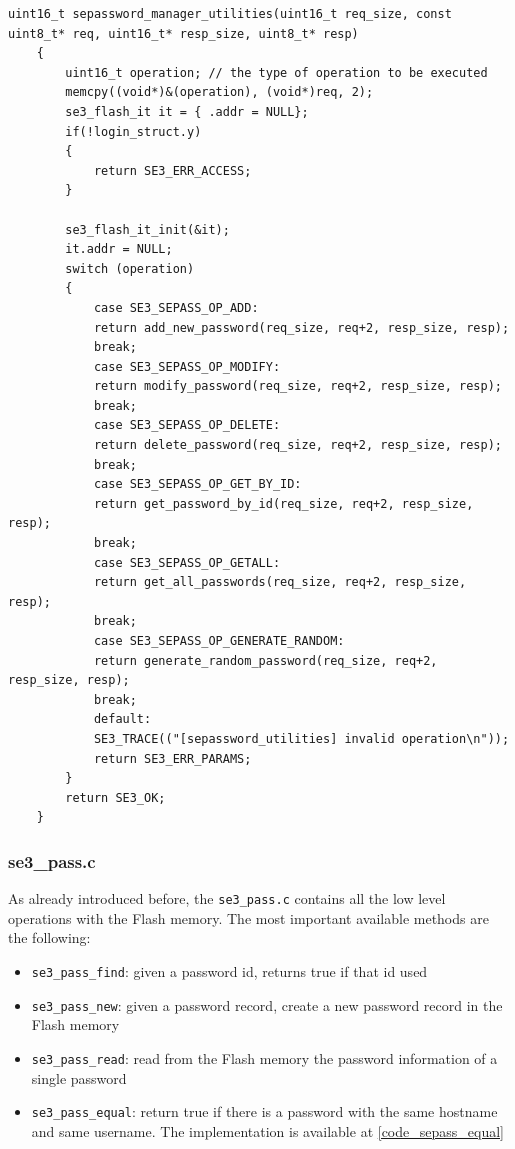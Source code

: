 \begin{lstlisting}[style=CStyle,caption="Code for searching if password record is already present", label=code_command_disp,breaklines=true]
	uint16_t sepassword_manager_utilities(uint16_t req_size, const uint8_t* req, uint16_t* resp_size, uint8_t* resp)
	{
		uint16_t operation; // the type of operation to be executed
		memcpy((void*)&(operation), (void*)req, 2);
		se3_flash_it it = { .addr = NULL};
		if(!login_struct.y)
		{
			return SE3_ERR_ACCESS;
		}
	
		se3_flash_it_init(&it);
		it.addr = NULL;
		switch (operation)
		{
			case SE3_SEPASS_OP_ADD:
			return add_new_password(req_size, req+2, resp_size, resp);
			break;
			case SE3_SEPASS_OP_MODIFY:
			return modify_password(req_size, req+2, resp_size, resp);
			break;
			case SE3_SEPASS_OP_DELETE:
			return delete_password(req_size, req+2, resp_size, resp);
			break;
			case SE3_SEPASS_OP_GET_BY_ID:
			return get_password_by_id(req_size, req+2, resp_size, resp);
			break;
			case SE3_SEPASS_OP_GETALL:
			return get_all_passwords(req_size, req+2, resp_size, resp);
			break;
			case SE3_SEPASS_OP_GENERATE_RANDOM:
			return generate_random_password(req_size, req+2, resp_size, resp);
			break;
			default:
			SE3_TRACE(("[sepassword_utilities] invalid operation\n"));
			return SE3_ERR_PARAMS;
		}
		return SE3_OK;
	}	
\end{lstlisting}



\subsubsection{se3\_pass.c}
As already introduced before, the \texttt{se3\_pass.c} contains all the low level operations with the Flash memory. The most important available methods are the following:
\begin{itemize}
	\item \texttt{se3\_pass\_find}: given a password id, returns true if that id used
	\item \texttt{se3\_pass\_new}: given a password record, create a new password record in the Flash memory
	\item \texttt{se3\_pass\_read}: read from the Flash memory the password information of a single password
	\item \texttt{se3\_pass\_equal}: return true if there is a password with the same hostname and same username. The implementation is available at \ref{code_sepass_equal}
\end{itemize}

